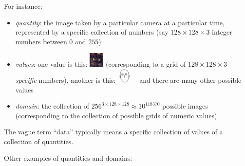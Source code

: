 \documentclass[
  a4paper,
  DIV=11,
  numbers=noendperiod,
  oneside]{scrreprt}
\providecommand{\tightlist}{%
  \setlength{\itemsep}{0pt}\setlength{\parskip}{0pt}}\usepackage{longtable,booktabs,array}
\begin{document}
For instance:

\begin{itemize}
\tightlist
\item
  \emph{quantity}: the image taken by a particular camera at a
  particular time, represented by a specific collection of numbers (say
  \(128\times128\times3\) integer numbers between \(0\) and \(255\))
\item
  \emph{values}: one value is this:
  \includegraphics[width=2em,height=\textheight]{cat_image.png}
  (corresponding to a grid of \(128\times128\times3\) \emph{specific}
  numbers), another is this:
  \includegraphics[width=2em,height=\textheight]{saitama_image.png} --
  and there are many other possible values
\item
  \emph{domain}: the collection of
  \(256^{3\times128\times128} \approx 10^{118 370}\) possible images
  (corresponding to the collection of possible grids of numeric values)
\end{itemize}

The vague term ``data'' typically means a specific collection of values
of a collection of quantities.

Other examples of quantities and domains:
\end{document}
